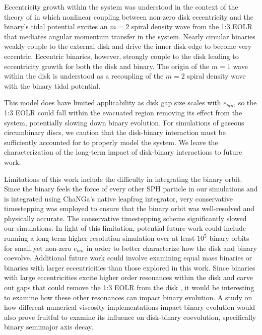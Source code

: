 Eccentricity growth within the system was understood in the context of the theory of \citet{Papaloizou01} in which nonlinear coupling between non-zero disk 
eccentricity and the binary's tidal potential excites an $m = 2$ spiral density wave from the 1:3 EOLR that mediates angular momentum transfer in the system.  
Nearly circular binaries weakly couple to the external disk and drive the inner disk edge to become very eccentric.  Eccentric binaries, however, strongly couple 
to the disk leading to eccentricity growth for both the disk and binary.  The origin of the $m = 1$ wave within the disk is understood as a recoupling of the $m = 
2$ spiral density wave with the binary tidal potential.

This model does have limited applicability as disk gap size scales with $e_{bin}$, so the 1:3 EOLR could fall within the evacuated region removing its effect 
from the system, potentially slowing down binary evolution. For simulations of gaseous circumbinary discs, we caution that the disk-binary interaction must be 
sufficiently accounted for to properly model the system.  We leave the characterization of the long-term impact of disk-binary interactions to future work.

Limitations of this work include the difficulty in integrating the binary orbit.  Since the binary feels the force of every other SPH particle in our simulations and is 
integrated using ChaNGa's native leapfrog integrator, very conservative timestepping was employed to ensure that the binary orbit was well-resolved and 
physically accurate.  The conservative timestepping scheme significantly slowed our simulations.  In light of this limitation, potential future work could include 
running a long-term higher resolution simulation over at least $10^5$ binary orbits for small yet non-zero $e_{bin}$ in order to better 
characterize how the disk and binary coevolve.  Additional future work could involve examining equal mass binaries or binaries with larger eccentricities than 
those explored in this work.  Since binaries with large eccentricities excite higher order resonances within the disk \citep[e.g.][]{Artymowicz1992,Arty2000} and carve out 
gaps that could remove the 1:3 EOLR from the disk \citep{Arty94}, it would be interesting to examine how these other resonances can impact binary evolution.  
A study on how different numerical viscosity implementations impact binary evolution would also prove fruitful to examine its influence on disk-binary 
coevolution, specifically binary semimajor axis decay.

